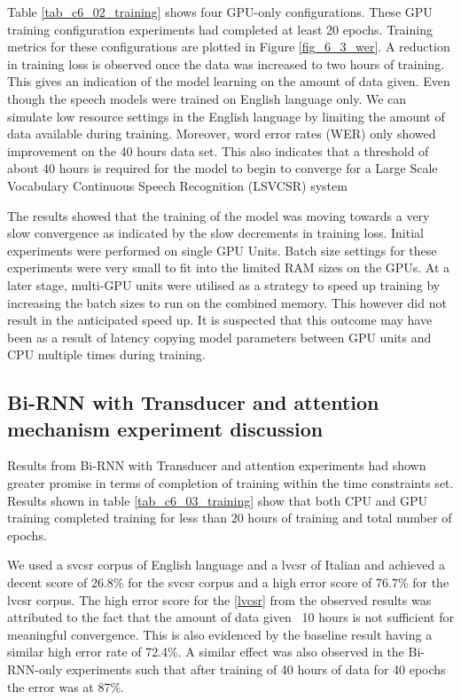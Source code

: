 Table \ref{tab_c6_02_training} shows four GPU-only configurations.  These GPU training configuration experiments had completed at least 20 epochs.  Training metrics for these configurations are plotted in Figure \ref{fig_6_3_wer}.   A reduction in training loss is observed once the data was increased to two hours of training.  This gives an indication of the model learning on the amount of data given.  Even though the speech models were trained on English language only.  We can simulate low resource settings in the English language by limiting the amount of data available during training.  Moreover, word error rates (WER) only showed improvement on the 40 hours data set.  This also indicates that a threshold of about 40 hours is required for the model to begin to converge for a Large Scale Vocabulary Continuous Speech Recognition (LSVCSR) system

The results showed that the training of the model was moving towards a very slow convergence as indicated by the slow decrements in training loss.  Initial experiments were performed on single GPU Units.  Batch size settings for these experiments were very small to fit into the limited RAM sizes on the GPUs.  At a later stage, multi-GPU units were utilised as a strategy to speed up training by increasing the batch sizes to run on the combined memory.  This however did not result in the anticipated speed up. It is suspected that this outcome may have been as a result of latency copying model parameters between GPU units and CPU multiple times during training.

\subsection{Bi-RNN with Transducer and attention mechanism experiment discussion}
Results from Bi-RNN with Transducer and attention experiments had shown greater promise in terms of completion of training within the time constraints set. Results shown in table \ref{tab_c6_03_training} show that both CPU and GPU training completed training for less than 20 hours of training and total number of epochs.

We used a \acrfull{svcsr} corpus of English language and a \acrfull{lvcsr} of Italian and achieved a decent score of 26.8\% for the \acrshort{svcsr} corpus and a high error score of 76.7\% for the \acrshort{lvcsr} corpus.  The high error score for the \ref{lvcsr} from the observed results was attributed to the fact that the amount of data given ~10 hours is not sufficient for meaningful convergence.  This is also evidenced by the baseline result having a similar high error rate of 72.4\%.  A similar effect was also observed in the Bi-RNN-only experiments such that after training of 40 hours of data for 40 epochs the error was at 87\%.

